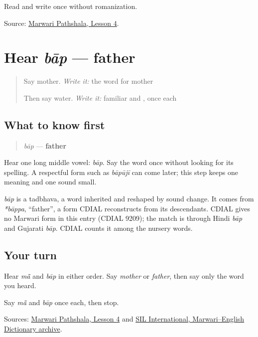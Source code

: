 \begin{tcolorbox}[breakable,colback=teal!4,colframe=teal!35!black,title={Before you move on}]
Read and write \textbf{} once without romanization.

Source: \href{https://www.marwaripathshala.com/marwari-lesson-4-english}{Marwari Pathshala, Lesson 4}.
\end{tcolorbox}
\section[bāp]{Hear \emph{bāp} — father}

\label{lesson:MW-C08-hear-baap}



\begin{quote}
Say mother. \emph{Write it:} the word for mother

Then say water. \emph{Write it:} familiar \textbf{} and \textbf{}, once each
\end{quote}

\subsection*{What to know first}
\begin{quote}
\emph{bāp} — \textbf{father}
\end{quote}

Hear one long middle vowel: \emph{bāp}. Say the word once without looking for its spelling. A respectful form such as \emph{bāpūjī} can come later; this step keeps one meaning and one sound small.

\begin{cousinweb}
\emph{bāp} is a tadbhava, a word inherited and reshaped by sound change. It comes from \emph{*bāppa}, \textquotedblleft{}father\textquotedblright{}, a form CDIAL reconstructs from its descendants. CDIAL gives no Marwari form in this entry (CDIAL 9209); the match is through Hindi \emph{bāp} and Gujarati \emph{bāp}. CDIAL counts it among the nursery words.
\end{cousinweb}

\subsection*{Your turn}
Hear \emph{mā̃} and \emph{bāp} in either order. Say \emph{mother} or \emph{father}, then say only the word you heard.

\begin{tcolorbox}[breakable,colback=teal!4,colframe=teal!35!black,title={Before you move on}]
Say \emph{mā̃} and \emph{bāp} once each, then stop.

Sources: \href{https://www.marwaripathshala.com/marwari-lesson-4-english}{Marwari Pathshala, Lesson 4} and \href{https://nepal.sil.org/resources/archives/63768}{SIL International, Marwari–English Dictionary archive}.
\end{tcolorbox}

